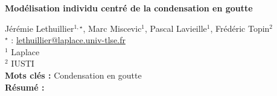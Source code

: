 


    \newpage


%
\begin{flushleft}
\addtocounter{section}{1}
{\Large \textbf{Modélisation individu centré de la condensation en goutte}}\label{ref:72}
\end{flushleft}
%
Jérémie Lethuillier$^{1,\star}$, Marc Miscevic$^{1}$, Pascal Lavieille$^{1}$, Frédéric Topin$^{2}$\\[2mm]
$^{\star}$ \Letter : \url{lethuillier@laplace.univ-tlse.fr}\\[2mm]
{\footnotesize $^{1}$ Laplace}\\
{\footnotesize $^{2}$ IUSTI}\\
[4mm]
%
\noindent \textbf{Mots clés : } Condensation en goutte\\[4mm]
%
\noindent \textbf{Résumé : } 

